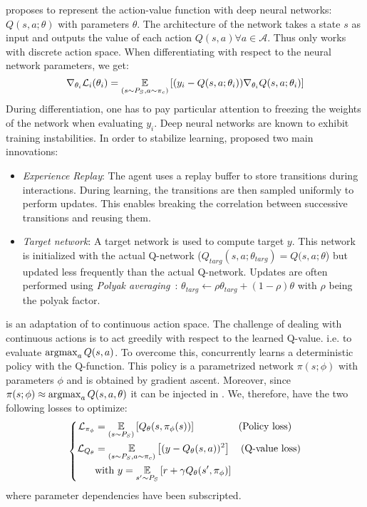 \textbf{\dqn} proposes to represent the action-value function with deep neural networks: $Q(s,a;\theta)$ with parameters $\theta$. The architecture of the network takes a state $s$ as input and outputs the value of each action $Q(s,a) \forall a \in \mathcal{A}$. Thus \dqn only works with discrete action space. When differentiating  with respect to the neural network parameters, we get:
\begin{equation}
	\nabla_{\theta_i }\mathcal{L}_i(\theta_i ) = \underset{(s\sim P_S, a\sim\pi_c)}{\mathbb{E}} \left[(y_i - Q(s,a;\theta _i))\nabla_{\theta_i }Q(s,a;\theta _i)\right]
\end{equation}
During differentiation, one has to pay particular attention to freezing the weights of the network when evaluating $y_i$. Deep neural networks are known to exhibit training instabilities. In order to stabilize learning, \citet{mnih2015human} proposed two main innovations: 
\begin{itemize}[noitemsep]
\item \textit{Experience Replay}: The agent uses a replay buffer to store transitions during interactions. During learning, the transitions are then sampled uniformly to perform updates. This enables breaking the correlation between successive transitions and reusing them.
\item \textit{Target network}: A target network is used to compute target $y$. This network is initialized with the actual Q-network ($Q_{targ}(s,a;\theta_{targ})=Q(s,a;\theta$) but updated less frequently than the actual Q-network. Updates are often performed using \textit{Polyak averaging}~\citep{polyak1992}: $\theta_{targ} \leftarrow \rho\theta_{targ} + (1-\rho)\theta$ with $\rho$ being the polyak factor.
\end{itemize}

\textbf{\ddpg} is an adaptation of \dqn to continuous action space. The challenge of dealing with continuous actions is to act greedily with respect to the learned Q-value. i.e. to evaluate $\operatorname*{argmax}_a Q(s,a)$. To overcome this, \ddpg concurrently learns a deterministic policy with the Q-function. This policy is a parametrized network $\pi(s;\phi)$ with parameters $\phi$ and is obtained by gradient ascent. Moreover, since $\pi(s;\phi) \approx \operatorname*{argmax}_a Q(s,a,\theta)$ it can be injected in . We, therefore, have the two following losses to optimize:
\begin{equation}
\left\{
\begin{split}
	\mathcal{L}_{\pi_\phi} &= \underset{(s\sim P_S)}{\mathbb{E}}\left[Q_\theta(s,\pi_\phi(s))\right] \quad \quad \quad \quad \text{ (Policy loss)}\\
	\mathcal{L}_{Q_\theta} &= \underset{(s\sim P_S,a\sim\pi_c)}{\mathbb{E}}\left[(y- Q_\theta(s,a))^2 \right] \quad \text{(Q-value loss)}\\
	& \text{with } y = \underset{s'\sim P_S}{\mathbb{E}}\left[r +\gamma Q_\theta(s',\pi_\phi)\right]
\end{split}
\right.
\end{equation}
where parameter dependencies have been subscripted.

